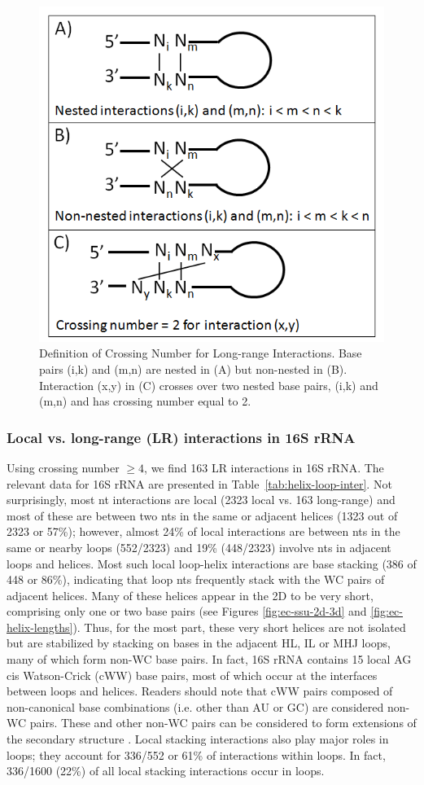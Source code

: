 \begin{figure}
  \includegraphics[width=0.5\linewidth]{chapter-1/figs/nested}
  \caption{Definition of Crossing Number for Long-range Interactions. Base pairs
    (i,k) and (m,n) are nested in (A) but non-nested in (B). Interaction (x,y)
    in (C) crosses over two nested base pairs, (i,k) and (m,n) and has crossing
  number equal to 2.}
  \label{fig:nesting}
\end{figure}

\subsubsection{Local vs. long-range (LR) interactions in 16S rRNA}

Using crossing number $\ge 4$, we find 163 LR interactions in 16S rRNA. The
relevant data for \EC{} 16S rRNA are presented in
Table~\ref{tab:helix-loop-inter}. Not surprisingly, most nt interactions are
local (2323 local vs. 163 long-range) and most of these are between two nts in
the same or adjacent helices (1323 out of 2323 or 57\%); however, almost 24\% of
local interactions are between nts in the same or nearby loops (552/2323) and
19\% (448/2323) involve nts in adjacent loops and helices. Most such local
loop-helix interactions are base stacking (386 of 448 or 86\%), indicating that
loop nts frequently stack with the WC pairs of adjacent helices. Many of these
helices appear in the 2D to be very short, comprising only one or two base pairs
(see Figures \ref{fig:ec-ssu-2d-3d} and
\ref{fig:ec-helix-lengths}). Thus, for the most part, these very short helices
are not isolated but are stabilized by stacking on bases in the adjacent HL, IL
or MHJ loops, many of which form non-WC base pairs. In fact, 16S rRNA contains
15 local AG cis Watson-Crick (cWW) base pairs, most of which occur at the
interfaces between loops and helices. Readers should note that cWW pairs
composed of non-canonical base combinations (i.e. other than AU or GC) are
considered non-WC pairs. These and other non-WC pairs can be considered to
form extensions of the secondary structure \cite{Gutell1990}. Local stacking
interactions also play major roles in loops; they account for 336/552 or 61\%
of interactions within loops. In fact, 336/1600 (22\%) of all local stacking
interactions occur in loops. 

